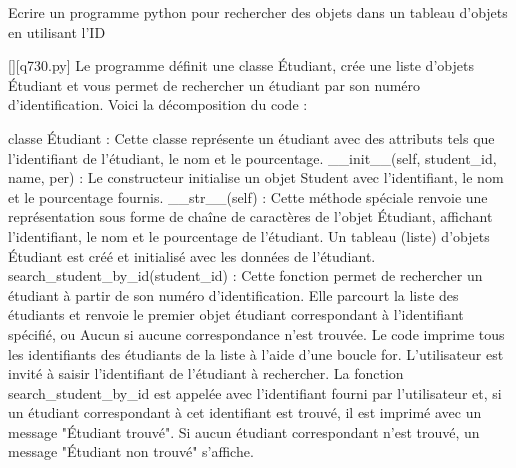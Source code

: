         \question
        Ecrire un programme python pour rechercher des objets dans un tableau d'objets en utilisant l'ID
        \par
        \begin{solution}
            \renewcommand{\nomfichier}{q730.py}
            \pythonfile{\chemincode \nomfichier}[][\nomfichier]
            Le programme définit une classe Étudiant, crée une liste d'objets Étudiant et vous permet de rechercher un étudiant par son numéro d'identification. Voici la décomposition du code :

    classe Étudiant : Cette classe représente un étudiant avec des attributs tels que l'identifiant de l'étudiant, le nom et le pourcentage.
    __init__(self, student_id, name, per) : Le constructeur initialise un objet Student avec l'identifiant, le nom et le pourcentage fournis.
    __str__(self) : Cette méthode spéciale renvoie une représentation sous forme de chaîne de caractères de l'objet Étudiant, affichant l'identifiant, le nom et le pourcentage de l'étudiant.
    Un tableau (liste) d'objets Étudiant est créé et initialisé avec les données de l'étudiant.
    search_student_by_id(student_id) : Cette fonction permet de rechercher un étudiant à partir de son numéro d'identification. Elle parcourt la liste des étudiants et renvoie le premier objet étudiant correspondant à l'identifiant spécifié, ou Aucun si aucune correspondance n'est trouvée.
    Le code imprime tous les identifiants des étudiants de la liste à l'aide d'une boucle for.
    L'utilisateur est invité à saisir l'identifiant de l'étudiant à rechercher.
    La fonction search_student_by_id est appelée avec l'identifiant fourni par l'utilisateur et, si un étudiant correspondant à cet identifiant est trouvé, il est imprimé avec un message "Étudiant trouvé". Si aucun étudiant correspondant n'est trouvé, un message "Étudiant non trouvé" s'affiche.
        \end{solution}
        

